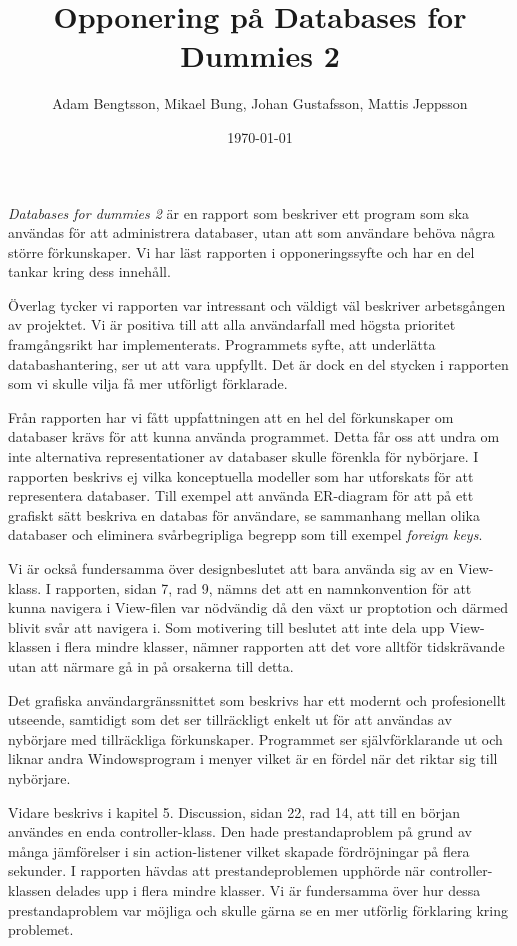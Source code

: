 \documentclass[a4paper, 12pt]{article}
\begin{document}
\title{Opponering på Databases for Dummies 2}
\author{
    Adam Bengtsson, 
    Mikael Bung, 
    Johan Gustafsson, 
    Mattis Jeppsson 
}
\date{\today}
\maketitle
    

\emph{Databases for dummies 2} är en rapport som beskriver ett program som ska användas för att administrera databaser, utan att som användare behöva några större förkunskaper. Vi har läst rapporten i opponeringssyfte och har en del tankar kring dess innehåll.

Överlag tycker vi rapporten var intressant och väldigt väl beskriver arbetsgången av projektet. Vi är positiva till att alla användarfall med högsta prioritet framgångsrikt har implementerats. Programmets syfte, att underlätta databashantering, ser ut att vara uppfyllt. Det är dock en del stycken i rapporten som vi skulle vilja få mer utförligt förklarade.

Från rapporten har vi fått uppfattningen att en hel del förkunskaper om databaser krävs för att kunna använda programmet. Detta får oss att undra om inte alternativa representationer av databaser skulle förenkla för nybörjare. I rapporten beskrivs ej vilka konceptuella modeller som har utforskats för att representera databaser. Till exempel att använda ER-diagram för att på ett grafiskt sätt beskriva en databas för användare, se sammanhang mellan olika databaser och eliminera svårbegripliga begrepp som till exempel \emph{foreign keys}.

Vi är också fundersamma över designbeslutet att bara använda sig av en View-klass. I rapporten, sidan 7, rad 9,  nämns det att en namnkonvention för att kunna navigera i View-filen var nödvändig då den växt ur proptotion och därmed blivit svår att navigera i. Som motivering till beslutet att inte dela upp View-klassen i flera mindre klasser, nämner rapporten att det vore alltför tidskrävande utan att närmare gå in på orsakerna till detta.

Det grafiska användargränssnittet som beskrivs har ett modernt och profesionellt utseende, samtidigt som det ser tillräckligt enkelt ut för att användas av nybörjare med tillräckliga förkunskaper. Programmet ser självförklarande ut och liknar andra Windowsprogram i menyer vilket är en fördel när det riktar sig till nybörjare. 

Vidare beskrivs i kapitel 5. Discussion, sidan 22, rad 14, att till en början användes en enda controller-klass. Den hade prestandaproblem på grund av många jämförelser i sin action-listener vilket skapade fördröjningar på flera sekunder. I rapporten hävdas att prestandeproblemen upphörde när controller-klassen delades upp i flera mindre klasser. Vi är fundersamma över hur dessa prestandaproblem var möjliga och skulle gärna se en mer utförlig förklaring kring problemet. 
\end{document}
